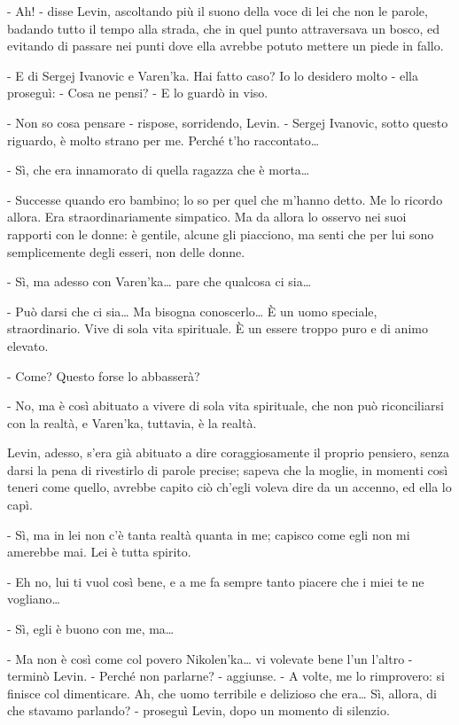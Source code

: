 - Ah! - disse Levin, ascoltando più il suono della voce di lei che non le parole, badando tutto il tempo alla strada, che in quel punto attraversava un bosco, ed evitando di passare nei punti dove ella avrebbe potuto mettere un piede in fallo. 

- E di Sergej Ivanovic e Varen'ka. Hai fatto caso? Io lo desidero molto - ella proseguì: - Cosa ne pensi? - E lo guardò in viso. 

- Non so cosa pensare - rispose, sorridendo, Levin. - Sergej Ivanovic, sotto questo riguardo, è molto strano per me. Perché t'ho raccontato\ldots{} 

- Sì, che era innamorato di quella ragazza che è morta\ldots{} 

- Successe quando ero bambino; lo so per quel che m'hanno detto. Me lo ricordo allora. Era straordinariamente simpatico. Ma da allora lo osservo nei suoi rapporti con le donne: è gentile, alcune gli piacciono, ma senti che per lui sono semplicemente degli esseri, non delle donne. 

- Sì, ma adesso con Varen'ka\ldots{} pare che qualcosa ci sia\ldots{} 

- Può darsi che ci sia\ldots{} Ma bisogna conoscerlo\ldots{} È un uomo speciale, straordinario. Vive di sola vita spirituale. È un essere troppo puro e di animo elevato. 

- Come? Questo forse lo abbasserà? 

- No, ma è così abituato a vivere di sola vita spirituale, che non può riconciliarsi con la realtà, e Varen'ka, tuttavia, è la realtà. 

Levin, adesso, s'era già abituato a dire coraggiosamente il proprio pensiero, senza darsi la pena di rivestirlo di parole precise; sapeva che la moglie, in momenti così teneri come quello, avrebbe capito ciò ch'egli voleva dire da un accenno, ed ella lo capì. 

- Sì, ma in lei non c'è tanta realtà quanta in me; capisco come egli non mi amerebbe mai. Lei è tutta spirito. 

- Eh no, lui ti vuol così bene, e a me fa sempre tanto piacere che i miei te ne vogliano\ldots{} 

- Sì, egli è buono con me, ma\ldots{} 

- Ma non è così come col povero Nikolen'ka\ldots{} vi volevate bene l'un l'altro - terminò Levin. - Perché non parlarne? - aggiunse. - A volte, me lo rimprovero: si finisce col dimenticare. Ah, che uomo terribile e delizioso che era\ldots{} Sì, allora, di che stavamo parlando? - proseguì Levin, dopo un momento di silenzio. 

